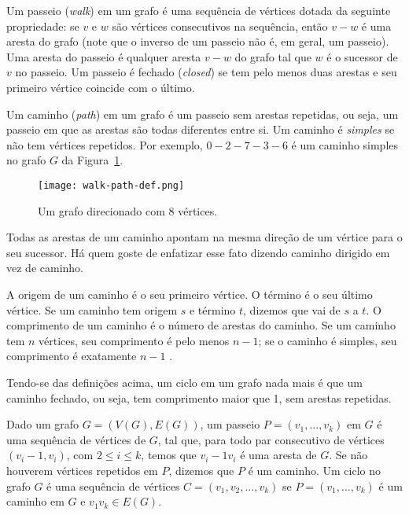Um passeio (\emph{walk}) em um grafo é uma sequência de vértices dotada da seguinte propriedade: se $v$ e $w$ são vértices consecutivos na sequência, então $v - w$ é uma aresta do grafo (note que o inverso de um passeio não é, em geral, um passeio). Uma aresta do passeio é qualquer aresta $v - w$ do grafo tal que $w$ é o sucessor de $v$ no passeio. Um passeio é fechado (\emph{closed}) se tem pelo menos duas arestas e seu primeiro vértice coincide com o último.

Um caminho (\emph{path}) em um grafo é um passeio sem arestas repetidas, ou seja, um passeio em que as arestas são todas diferentes entre si. Um caminho é \emph{simples} se não tem vértices repetidos. Por exemplo, $0 - 2 - 7 - 3 - 6$ é um caminho simples no grafo $G$ da Figura~\ref{sec2:walk-path-def}.

\begin{figure}
    \centering
    \texttt{[image: walk-path-def.png]}
    \caption{Um grafo direcionado com 8 vértices.}
    \label{sec2:walk-path-def}
\end{figure}

Todas as arestas de um caminho apontam na mesma direção de um vértice para o seu sucessor. Há quem goste de enfatizar esse fato dizendo caminho dirigido em vez de caminho.

A origem de um caminho é o seu primeiro vértice. O término é o seu último vértice. Se um caminho tem origem $s$ e término $t$, dizemos que vai de $s$ a $t$. O comprimento de um caminho é o número de arestas do caminho. Se um caminho tem $n$ vértices, seu comprimento é pelo menos \begin{math}n - 1\end{math}; se o caminho é simples, seu comprimento é exatamente \begin{math}n - 1\end{math} \cite{feofiloff2018}.

Tendo-se das definições acima, um ciclo em um grafo nada mais é que um caminho fechado, ou seja, tem comprimento maior que 1, sem arestas repetidas.

\begin{definition}
    Dado um grafo $G = (V(G), E(G))$, um passeio $P = (v_1, ..., v_k)$ em $G$ é uma sequência de vértices de $G$, tal que, para todo par consecutivo de vértices $(v_i - 1, v_i)$, com $2 \leq i \leq k$, temos que $v_i - 1v_i$ é uma aresta de $G$. Se não houverem vértices repetidos em $P$, dizemos que $P$  é um caminho. Um ciclo no grafo $G$ é uma sequência de vértices $C = (v_1,v_2,...,v_k)$ se $P = (v_1, ..., v_k)$ é um caminho em $G$ e $v_1v_k \in E(G)$.
\end{definition}


